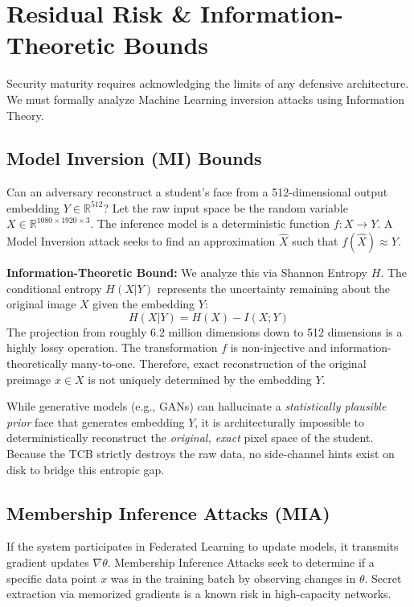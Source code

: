 \documentclass[conference]{IEEEtran}
\begin{document}
\section{Residual Risk \& Information-Theoretic Bounds}
Security maturity requires acknowledging the limits of any defensive architecture. We must formally analyze Machine Learning inversion attacks using Information Theory.

\subsection{Model Inversion (MI) Bounds}
Can an adversary reconstruct a student's face from a 512-dimensional output embedding $Y \in \mathbb{R}^{512}$?
Let the raw input space be the random variable $X \in \mathbb{R}^{1080 \times 1920 \times 3}$.
The inference model is a deterministic function $f: X \to Y$. 
A Model Inversion attack \cite{b23} seeks to find an approximation $\hat{X}$ such that $f(\hat{X}) \approx Y$.

\textbf{Information-Theoretic Bound:} We analyze this via Shannon Entropy $H$. The conditional entropy $H(X | Y)$ represents the uncertainty remaining about the original image $X$ given the embedding $Y$:
\begin{equation}
H(X | Y) = H(X) - I(X;Y)
\end{equation}
The projection from roughly 6.2 million dimensions down to 512 dimensions is a highly lossy operation. The transformation $f$ is non-injective and information-theoretically many-to-one. Therefore, exact reconstruction of the original preimage $x \in X$ is not uniquely determined by the embedding $Y$.

While generative models (e.g., GANs) can hallucinate a \textit{statistically plausible prior} face that generates embedding $Y$, it is architecturally impossible to deterministically reconstruct the \textit{original, exact} pixel space of the student. Because the TCB strictly destroys the raw data, no side-channel hints exist on disk to bridge this entropic gap. 

\subsection{Membership Inference Attacks (MIA)}
If the system participates in Federated Learning to update models, it transmits gradient updates $\nabla \theta$. Membership Inference Attacks \cite{b5} seek to determine if a specific data point $x$ was in the training batch by observing changes in $\theta$. Secret extraction via memorized gradients \cite{b21} is a known risk in high-capacity networks.
\end{document}
